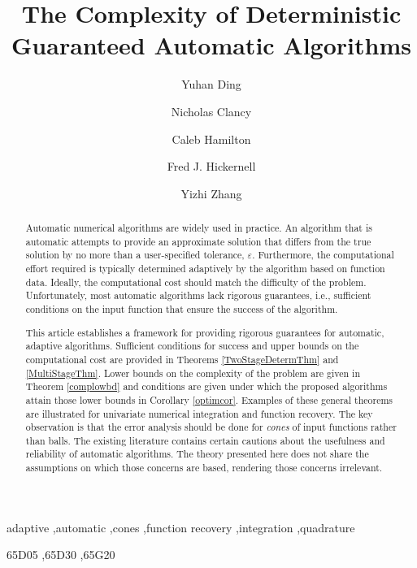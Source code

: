 \documentclass[]{elsarticle}
\theoremstyle{definition}
\theoremstyle{remark}
\begin{document}
\begin{frontmatter}

\title{The Complexity of Deterministic Guaranteed Automatic Algorithms}
\author{Yuhan Ding}
\author{Nicholas Clancy}
\author{Caleb Hamilton}
\author{Fred J. Hickernell}
\author{Yizhi Zhang}
\address{Room E1-208, Department of Applied Mathematics, Illinois Institute of Technology,\\ 10 W.\ 32$^{\text{nd}}$ St., Chicago, IL 60616}
\begin{abstract} Automatic numerical algorithms are widely used in practice.  An algorithm that is automatic attempts to provide an approximate solution that differs from the true solution by no more than a user-specified tolerance, $\varepsilon$. Furthermore, the computational effort required is typically determined adaptively by the algorithm based on function data.  Ideally, the computational cost should match the difficulty of the problem.  Unfortunately, most automatic algorithms lack rigorous guarantees, i.e., sufficient conditions on the input function that ensure the success of the algorithm. 

This article establishes a framework for providing rigorous guarantees for automatic, adaptive algorithms. Sufficient conditions for success and upper bounds on the computational cost are provided in Theorems \ref{TwoStageDetermThm} and \ref{MultiStageThm}.  Lower bounds on the complexity of the problem are given in Theorem \ref{complowbd} and conditions are given under which the proposed algorithms attain those lower bounds in Corollary \ref{optimcor}. Examples of these general theorems are illustrated for univariate numerical integration and function recovery.  The key observation is that the error analysis should be done for \emph{cones} of input functions rather than balls. The existing literature contains certain cautions about the usefulness and reliability of automatic algorithms.  The theory presented here does not share the assumptions on which those concerns are based, rendering those concerns irrelevant.
\end{abstract}

\begin{keyword}
adaptive \sep automatic \sep cones \sep function recovery \sep integration \sep quadrature

\MSC[2010] 65D05 \sep 65D30 \sep 65G20

\end{keyword}
\end{frontmatter}
\end{document}
